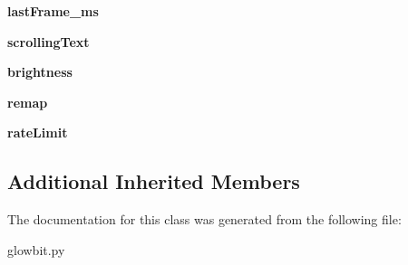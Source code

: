 \begin{DoxyCompactItemize}
{\bfseries last\+Frame\+\_\+ms}
\item 
\mbox{\label{classglowbit_1_1matrix4x4_a60001cda5a86c8d035838f528e3428dc}} 
{\bfseries scrolling\+Text}
\item 
\mbox{\label{classglowbit_1_1matrix4x4_aaa175c98bbdcb35a83dd59192ee0686f}} 
{\bfseries brightness}
\item 
\mbox{\label{classglowbit_1_1matrix4x4_a8d2971111428adb5e6ed35b6f07b63de}} 
{\bfseries remap}
\item 
\mbox{\label{classglowbit_1_1matrix4x4_acfc0f73dcf2d58bb48aec88b6fc0eb33}} 
{\bfseries rate\+Limit}
\end{DoxyCompactItemize}
\subsection*{Additional Inherited Members}


The documentation for this class was generated from the following file\+:\begin{DoxyCompactItemize}
\item 
glowbit.\+py\end{DoxyCompactItemize}
